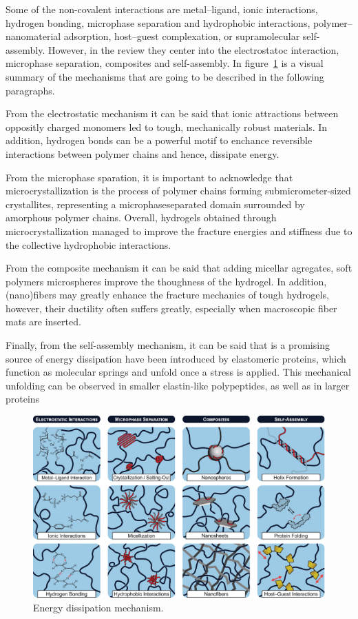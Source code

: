 Some of the non-covalent interactions are 
    metal–ligand, 
    ionic interactions, 
    hydrogen bonding, 
    microphase separation 
    and hydrophobic interactions, 
    polymer–nanomaterial adsorption, 
    host–guest complexation, 
    or supramolecular self-assembly.
However, in the review they center into the electrostatoc interaction, microphase separation, composites and self-assembly.
In figure~\ref{fig:energyDissipation} is a visual summary of the mechanisms that are going to be described in the following paragraphs.

From the electrostatic mechanism it can be said that ionic attractions between oppositly charged monomers led to tough, mechanically robust materials.
In addition, hydrogen bonds can be a powerful motif to enchance reversible interactions between polymer chains and hence, dissipate energy.

From the microphase sparation, it is important to acknowledge that microcrystallization is the process of polymer chains forming submicrometer-sized crystallites, representing a microphaseseparated domain surrounded by amorphous polymer chains.
Overall, hydrogels obtained through microcrystallization managed to improve the fracture energies and stiffness due to the collective hydrophobic interactions. 

From the composite mechanism it can be said that adding micellar agregates, soft polymers microspheres improve the thoughness of the hydrogel.
In addition, (nano)fibers may greatly enhance the fracture mechanics of tough hydrogels, however, their ductility often suffers greatly, especially when macroscopic fiber mats are inserted.

Finally, from the self-assembly mechanism, it can be said that is a promising source of energy dissipation have been introduced by elastomeric proteins, which function as molecular springs and unfold once a stress is applied. 
This mechanical unfolding can be observed in smaller elastin-like polypeptides, as well as in larger proteins

\begin{figure}[ht!]
    \centering
    \includegraphics[width=12cm]{figs/explainMechResponse/energyDissipationMechanisms.png
}
    \caption{Energy dissipation mechanism\citep{petelinsekToughHydrogelsLoadBearing2024}.}\label{fig:energyDissipation}
\end{figure}


